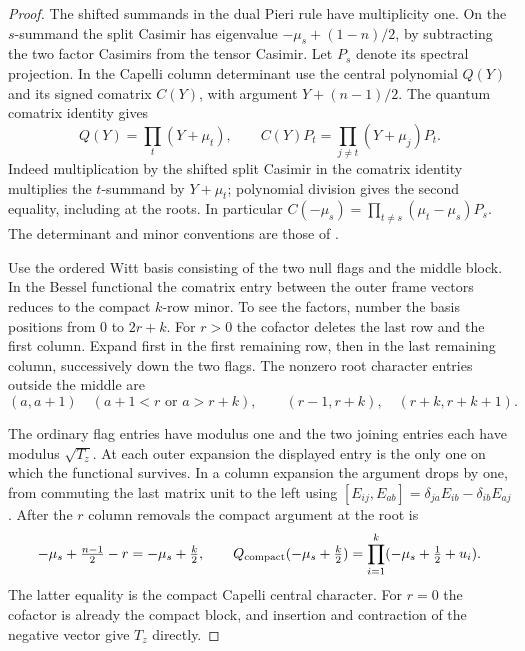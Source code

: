 \begin{proof}
The shifted summands in the dual Pieri rule have multiplicity one.
On the \(s\)-summand the split Casimir has eigenvalue
\(-\mu_s+(1-n)/2\), by subtracting the two factor Casimirs from
the tensor Casimir. Let \(P_s\) denote its spectral projection. In the
Capelli column determinant use the central polynomial \(Q(Y)\)
and its signed comatrix \(C(Y)\), with argument \(Y+(n-1)/2\).
The quantum comatrix identity gives
\[
 Q(Y)=\prod_t(Y+\mu_t),\qquad
 C(Y)P_t=\prod_{j\ne t}(Y+\mu_j)P_t .
\]
Indeed multiplication by the shifted split Casimir in the comatrix
identity multiplies the \(t\)-summand by \(Y+\mu_t\); polynomial
division gives the second equality, including at the roots.
In particular \(C(-\mu_s)=\prod_{t\ne s}(\mu_t-\mu_s)P_s\).
The determinant and minor conventions are those of
\cite[Proposition~2.7(4) and Remarks~2.8(1), 2.11]{mno-yangians}.

Use the ordered Witt basis consisting of the two null flags and
the middle block. In the Bessel functional the comatrix entry
between the outer frame vectors reduces to the compact \(k\)-row
minor. To see the factors, number the basis positions from
\(0\) to \(2r+k\). For \(r>0\) the cofactor deletes the last row
and the first column. Expand first in the first remaining row,
then in the last remaining column, successively down the two flags.
The nonzero root character entries outside the middle are
\[
 (a,a+1)\quad(a+1<r\text{ or }a>r+k),\qquad
 (r-1,r+k),\quad(r+k,r+k+1).
\]

The ordinary flag entries have modulus one and the two joining
entries each have modulus \(\sqrt{T_z}\). At each outer expansion
the displayed entry is the only one on which the functional survives.
In a column expansion the argument drops by one, from commuting
the last matrix unit to the left using
\([E_{ij},E_{ab}]=\delta_{ja}E_{ib}-\delta_{ib}E_{aj}\).
After the \(r\) column removals the compact argument at the root is
\[
 -\mu_s+\tfrac{n-1}{2}-r=-\mu_s+\tfrac k2,\qquad
 Q_{\rm compact}(-\mu_s+\tfrac k2)
       =\prod_{i=1}^k(-\mu_s+\tfrac12+u_i).
\]
The latter equality is the compact Capelli central character. For
\(r=0\) the cofactor is already the compact block, and insertion
and contraction of the negative vector give \(T_z\) directly.


\end{proof}
